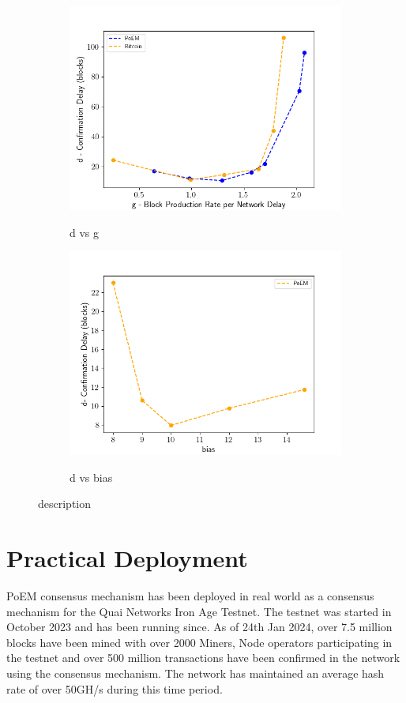 \begin{figure}
    \centering
    \begin{subfigure}{0.49\textwidth}
    \centering
    \caption{d vs g}
    \includegraphics[width = \textwidth]{figures/dvsg.png}
    \label{fig:dvsg}
    \end{subfigure}
    \begin{subfigure}{0.49\textwidth}
    \centering
    \caption{d vs bias}
    \includegraphics[width = \textwidth]{figures/gamma.png}
    \label{fig:right}
    \end{subfigure}
    \caption{description}
    \label{fig:gamma}
\end{figure}

\section{Practical Deployment}
PoEM consensus mechanism has been deployed in real world as a consensus
mechanism for the Quai Networks Iron Age Testnet. The testnet was started in
October 2023 and has been running since. As of 24th Jan 2024, over 7.5 million
blocks have been mined with over 2000 Miners, Node operators participating in
the testnet and over 500 million transactions have been confirmed in the network
using the consensus mechanism. The network has maintained an average hash rate
of over 50GH/s during this time period.